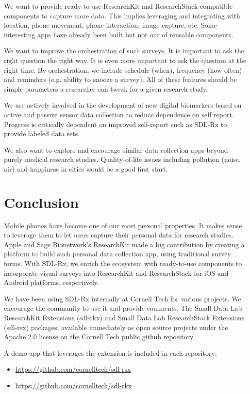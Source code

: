 \documentclass{acm_proc_article-sp}
\begin{document}
We want to provide ready-to-use ResearchKit and ResearchStack-compatible components to capture more data. This implies leveraging and integrating with location, phone movement, phone interaction, image capture, etc. Some interesting apps have already been built but not out of reusable components.

We want to improve the orchestration of such surveys. It is important to ask the right question the right way. It is even more important to ask the question at the right time. By orchestration, we include schedule (when), frequency (how often) and reminders (e.g. ability to snooze a survey). All of these features should be simple parameters a researcher can tweak for a given research study.

We are actively involved in the development of new digital biomarkers based on active and passive  sensor data collection to reduce dependence on self report. Progress is critically dependent on improved self-report such as SDL-Rx to provide labeled data sets.

We also want to explore and encourage similar data collection apps beyond purely medical research studies. Quality-of-life issues including pollution (noise, air) and happiness in cities would be a good first start.

\section{Conclusion}
Mobile phones have become one of our most personal properties. It makes sense to leverage them to let users capture their personal data for research studies. Apple and Sage Bionetwork's ResearchKit made a big contribution by creating a platform to build such personal data collection app, using traditional survey forms. With SDL-Rx, we enrich the ecosystem with ready-to-use components to incorporate visual surveys into ResearchKit and ResearchStack for iOS and Android platforms, respectively.

We have been using SDL-Rx internally at Cornell Tech for various projects. We encourage the community to use it and provide comments. The Small Data Lab ResearchKit Extensions (sdl-rkx) and Small Data Lab ResearchStack Extensions (sdl-rsx) packages, available immediately as open source projects under the Apache 2.0 license on the Cornell Tech public github repository.

A demo app that leverages the extension is included in each repository:
\begin{itemize}[noitemsep, topsep=-5pt]
\item \href{https://github.com/cornelltech/sdl-rsx}{https://github.com/cornelltech/sdl-rsx}
\item \href{https://github.com/cornelltech/sdl-rkx}{https://github.com/cornelltech/sdl-rkx}
\end{itemize}


\vspace{2.5mm}

\end{document}
